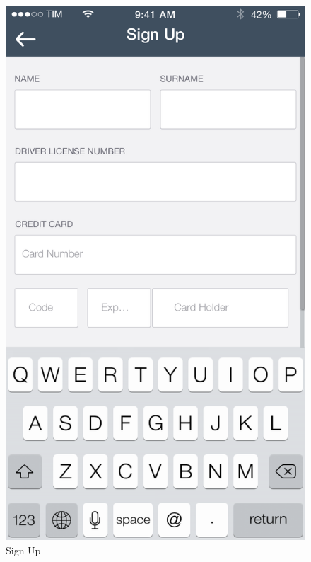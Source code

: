 \documentclass[12pt]{article}
\begin{document}
\begin{figure}
 	 	  \includegraphics[scale=0.25]{Images/Register.png}
		  \caption{Sign Up}
		  \endminipage
 	 	\end{figure}
 	 	
\end{document}
